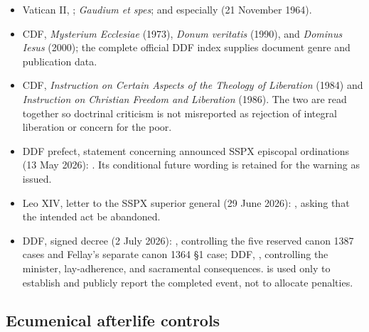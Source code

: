 \begin{itemize}
  \item Vatican II, ; \emph{Gaudium et spes}; and especially  (21 November 1964).
  \item CDF, \emph{Mysterium Ecclesiae} (1973), \emph{Donum veritatis} (1990), and \emph{Dominus Iesus} (2000); the complete official DDF index supplies document genre and publication data.
  \item CDF, \emph{Instruction on Certain Aspects of the Theology of Liberation} (1984) and \emph{Instruction on Christian Freedom and Liberation} (1986). The two are read together so doctrinal criticism is not misreported as rejection of integral liberation or concern for the poor.
  \item DDF prefect, statement concerning announced SSPX episcopal ordinations (13 May 2026): . Its conditional future wording is retained for the warning as issued.
  \item Leo XIV, letter to the SSPX superior general (29 June 2026): , asking that the intended act be abandoned.
  \item DDF, signed decree (2 July 2026): , controlling the five reserved canon 1387 cases and Fellay's separate canon 1364 \S1 case; DDF, , controlling the minister, lay-adherence, and sacramental consequences.  is used only to establish and publicly report the completed event, not to allocate penalties.
\end{itemize}

\subsection{Ecumenical afterlife controls}

